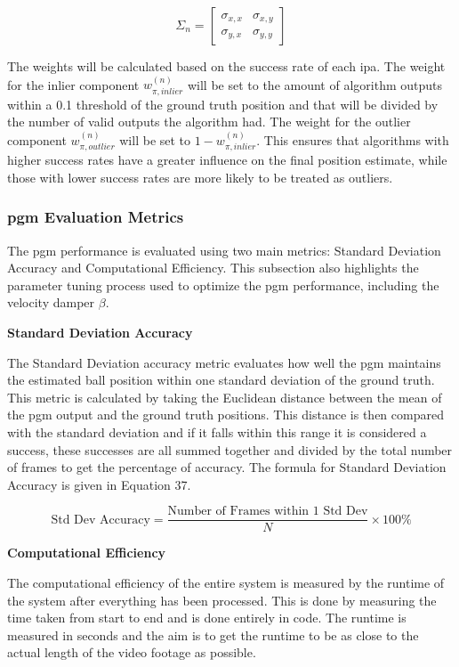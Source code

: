 \documentclass[12pt,a4paper]{article}
\begin{document}
\begin{equation}
\Sigma_n = \begin{bmatrix}
\sigma_{x,x} & \sigma_{x,y} \\
\sigma_{y,x} & \sigma_{y,y}
\end{bmatrix}
\end{equation}

The weights will be calculated based on the success rate of each \acs{ipa}. The weight for the inlier component $w_{\pi,inlier}^{(n)}$ will be set to the amount of algorithm outputs within a 0.1 threshold of the ground truth position and that will be divided by the number of valid outputs the algorithm had. The weight for the outlier component $w_{\pi,outlier}^{(n)}$ will be set to $1 - w_{\pi,inlier}^{(n)}$. This ensures that algorithms with higher success rates have a greater influence on the final position estimate, while those with lower success rates are more likely to be treated as outliers.

\subsubsection{\acs{pgm} Evaluation Metrics}
The \acs{pgm} performance is evaluated using two main metrics: Standard Deviation Accuracy and Computational Efficiency. This subsection also highlights the parameter tuning process used to optimize the \acs{pgm} performance, including the velocity damper $\beta$.

\textbf{Standard Deviation Accuracy}

The Standard Deviation accuracy metric evaluates how well the \acs{pgm} maintains the estimated ball position within one standard deviation of the ground truth. This metric is calculated by taking the Euclidean distance between the mean of the \acs{pgm} output and the ground truth positions. This distance is then compared with the standard deviation and if it falls within this range it is considered a success, these successes are all summed together and divided by the total number of frames to get the percentage of accuracy. The formula for Standard Deviation Accuracy is given in Equation 37.

\begin{equation}
\text{Std Dev Accuracy} = \frac{\text{Number of Frames within 1 Std Dev}}{N} \times 100\%
\end{equation}

\textbf{Computational Efficiency}

The computational efficiency of the entire system is measured by the runtime of the system after everything has been processed. This is done by measuring the time taken from start to end and is done entirely in code. The runtime is measured in seconds and the aim is to get the runtime to be as close to the actual length of the video footage as possible.
\end{document}
